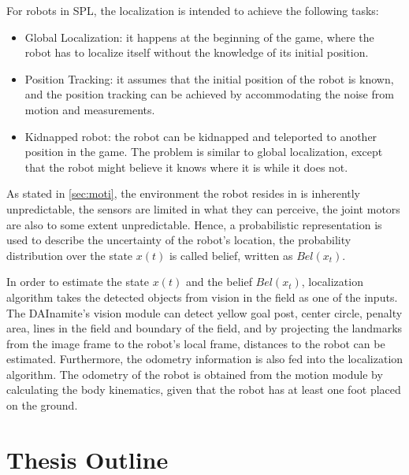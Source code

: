 For robots in \gls{SPL}, the localization is intended to achieve the following tasks:
\begin{itemize}
  \item Global Localization: it happens at the beginning of the game, where the robot has to localize itself without the knowledge of its initial position.
  \item Position Tracking: it assumes that the initial position of the robot is known, and the position tracking can be achieved by accommodating the noise from motion and measurements.
  \item Kidnapped robot: the robot can be kidnapped and teleported to another position in the game. The problem is similar to global localization, except that the robot might believe it knows where it is while it does not.
\end{itemize}
As stated in \autoref{sec:moti}, the environment the robot resides in is inherently unpredictable, the sensors are limited in what they can perceive, the joint motors are also to some extent unpredictable. Hence, a probabilistic representation is used to describe the uncertainty of the robot's location, the probability distribution over the state $x(t)$ is called belief, written as $Bel(x_{t})$.

In order to estimate the state $x(t)$ and the belief $Bel(x_{t})$, localization algorithm takes the detected objects from vision in the field as one of the inputs. The DAInamite's vision module can detect yellow goal post, center circle, penalty area, lines in the field and boundary of the field, and by projecting the landmarks from the image frame to the robot's local frame, distances to the robot can be estimated. Furthermore, the odometry information is also fed into the localization algorithm. The odometry of the robot is obtained from the motion module by calculating the body kinematics, given that the robot has at least one foot placed on the ground.
\section{Thesis Outline\label{sec:outline}}

